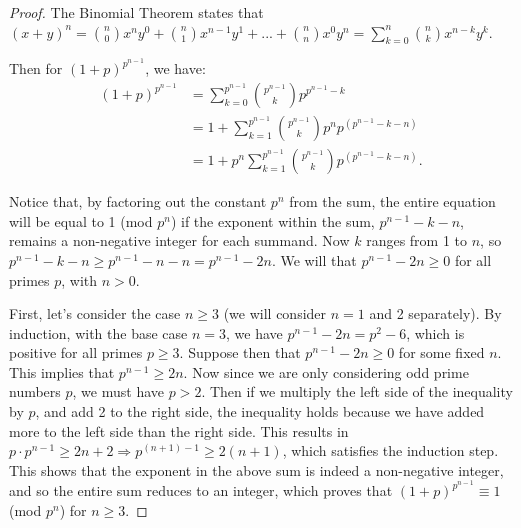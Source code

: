 \documentclass{article}
\begin{document}
\begin{proof}
    The Binomial Theorem states that $(x + y)^n = \binom{n}{0}x^n y^0 + \binom{n}{1}x^{n - 1}y^1 + ... + \binom{n}{n}x^0y^n = \sum_{k = 0}^{n} \binom{n}{k} x^{n - k}y^k$.

    Then for $(1 + p)^{p^{n - 1}}$, we have:
    \begin{align*}
        (1 + p)^{p^{n - 1}} 
        & = \sum_{k = 0}^{p^{n - 1}} \binom{p^{n - 1}}{k} p^{{p^{n - 1}} - k} \\ 
        & = 1 + \sum_{k = 1}^{p^{n - 1}} \binom{p^{n - 1}}{k} p^n p^{({p^{n - 1}} - k - n)} \\ 
        & = 1 + p^n \sum_{k = 1}^{p^{n - 1}} \binom{p^{n - 1}}{k} p^{({p^{n - 1}} - k - n)}.
    \end{align*}

    Notice that, by factoring out the constant $p^n$ from the sum, the entire equation will be equal to 1 (mod $p^n$) if the exponent within the sum, $p^{n - 1} - k - n$, remains a non-negative integer for each summand. Now $k$ ranges from 1 to $n$, so $p^{n - 1} - k - n \geq p^{n - 1} - n - n = p^{n - 1} - 2n$. We will that $p^{n - 1} - 2n \geq 0$ for all primes $p$, with $n > 0$.

    First, let's consider the case $n \geq 3$ (we will consider $n = 1$ and 2 separately). By induction, with the base case $n = 3$, we have $p^{n - 1} - 2n = p^2 - 6$, which is positive for all primes $p \geq 3$. Suppose then that $p^{n - 1} - 2n \geq 0$ for some fixed $n$. This implies that $p^{n - 1} \geq 2n$. Now since we are only considering odd prime numbers $p$, we must have $p > 2$. Then if we multiply the left side of the inequality by $p$, and add 2 to the right side, the inequality holds because we have added more to the left side than the right side. This results in $p \cdot p^{n - 1} \geq 2n + 2 \Rightarrow p^{(n + 1) - 1} \geq 2(n + 1)$, which satisfies the induction step. This shows that the exponent in the above sum is indeed a non-negative integer, and so the entire sum reduces to an integer, which proves that $(1 + p)^{p^{n - 1}} \equiv 1$ (mod $p^n$) for $n \geq 3$.


\end{proof}
\end{document}
